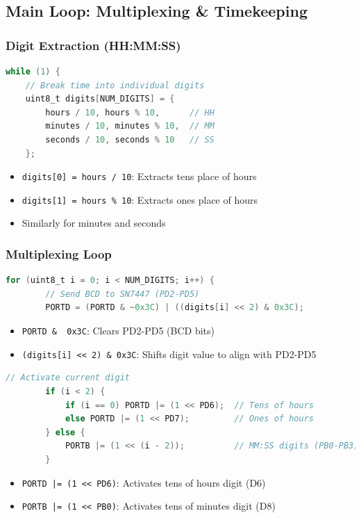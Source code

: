 \documentclass{article}
\begin{document}
\subsection{Main Loop: Multiplexing \& Timekeeping}
\subsubsection{Digit Extraction (HH:MM:SS)}
\begin{lstlisting}[language=C]
while (1) {
    // Break time into individual digits
    uint8_t digits[NUM_DIGITS] = {
        hours / 10, hours % 10,      // HH
        minutes / 10, minutes % 10,  // MM
        seconds / 10, seconds % 10   // SS
    };
\end{lstlisting}

\begin{itemize}
\item \texttt{digits[0] = hours / 10}: Extracts tens place of hours
\item \texttt{digits[1] = hours \% 10}: Extracts ones place of hours
\item Similarly for minutes and seconds
\end{itemize}

\subsubsection{Multiplexing Loop}
\begin{lstlisting}[language=C]
    for (uint8_t i = 0; i < NUM_DIGITS; i++) {
        // Send BCD to SN7447 (PD2-PD5)
        PORTD = (PORTD & ~0x3C) | ((digits[i] << 2) & 0x3C);
\end{lstlisting}

\begin{itemize}
\item \texttt{PORTD \& ~0x3C}: Clears PD2-PD5 (BCD bits)
\item \texttt{(digits[i] << 2) \& 0x3C}: Shifts digit value to align with PD2-PD5
\end{itemize}

\begin{lstlisting}[language=C]
        // Activate current digit
        if (i < 2) {
            if (i == 0) PORTD |= (1 << PD6);  // Tens of hours
            else PORTD |= (1 << PD7);         // Ones of hours
        } else {
            PORTB |= (1 << (i - 2));          // MM:SS digits (PB0-PB3)
        }
\end{lstlisting}

\begin{itemize}
\item \texttt{PORTD |= (1 << PD6)}: Activates tens of hours digit (D6)
\item \texttt{PORTB |= (1 << PB0)}: Activates tens of minutes digit (D8)
\end{itemize}
\end{document}
